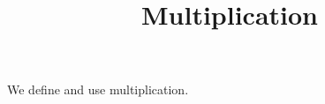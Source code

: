 \documentclass{ximera}
\title{Multiplication}
\begin{document}
\begin{abstract}
\end{abstract}
\maketitle

We define and use multiplication.
\end{document}
